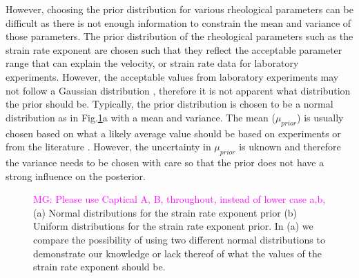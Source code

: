 \documentclass[12pt]{article}
\newcommand{\mgnote}[1]{\textcolor{magenta}{MG: #1}}
\begin{document}
However, choosing the prior distribution for various rheological parameters can be difficult as there is not enough information to constrain the mean and variance of those parameters. The prior distribution of the rheological parameters such as the strain rate exponent are chosen such that they reflect the acceptable parameter range that can explain the velocity, or strain rate data for laboratory experiments. However, the acceptable values from laboratory experiments may not follow a Gaussian distribution \citep{korenaga2008new}, therefore it is not apparent what distribution the prior should be.  Typically, the prior distribution is chosen to be a normal distribution as in Fig.\ref{fig:prior_ex}a 
 with a mean and variance. The mean ($\mu_{prior}$) is usually chosen based on what a likely average value should be based on experiments or from  the literature \citep{korenaga2008new}. However, the uncertainty in $\mu_{prior}$ is uknown and therefore the variance needs to be chosen with care so that the prior does not have a strong influence on the posterior.    %
\begin{figure}[H]
\centering
\hspace{-1.2cm}
\hspace{-0.2cm}

\caption{\mgnote{Please use Captical A, B, throughout, instead of lower case a,b,}(a) Normal distributions for the strain rate exponent prior (b) Uniform distributions for the strain rate exponent prior. In (a) we compare the possibility of using two different normal distributions to demonstrate our knowledge or lack thereof of what the values of the strain rate exponent should be. }
\label{fig:prior_ex} 
\end{figure}
\end{document}
